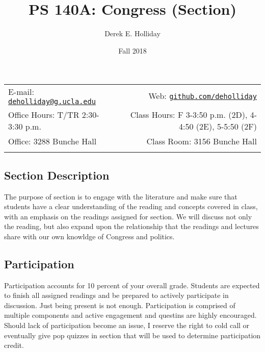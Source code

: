 \documentclass[11pt,]{article}
\title{PS 140A: Congress (Section)}
\author{Derek E. Holliday}
\date{Fall 2018}
\begin{document}
  

		\maketitle
		
	
		\thispagestyle{firststyle}



	\noindent \begin{tabular*}{\textwidth}{ @{\extracolsep{\fill}} lr @{\extracolsep{\fill}}}


E-mail: \texttt{\href{mailto:deholliday@g.ucla.edu}{\nolinkurl{deholliday@g.ucla.edu}}} & Web: \href{http://github.com/deholliday}{\tt github.com/deholliday}\\
Office Hours: T/TR 2:30-3:30 p.m.  &  Class Hours: F 3-3:50 p.m. (2D), 4-4:50 (2E), 5-5:50 (2F)\\
Office: 3288 Bunche Hall  & Class Room: 3156 Bunche Hall\\
	&  \\
	\hline
	\end{tabular*}
	
\vspace{2mm}
	


\subsection{Section Description}\label{section-description}

The purpose of section is to engage with the literature and make sure
that students have a clear understanding of the reading and concepts
covered in class, with an emphasis on the readings assigned for section.
We will discuss not only the reading, but also expand upon the
relationship that the readings and lectures share with our own knowldge
of Congress and politics.

\subsection{Participation}\label{participation}

Participation accounts for 10 percent of your overall grade. Students
are expected to finish all assigned readings and be prepared to actively
participate in discussion. Just being present is not enough.
Participation is comprised of multiple components and active engagement
and questins are highly encouraged. Should lack of participation become
an issue, I reserve the right to cold call or eventually give pop
quizzes in section that will be used to determine participation credit.
\end{document}
